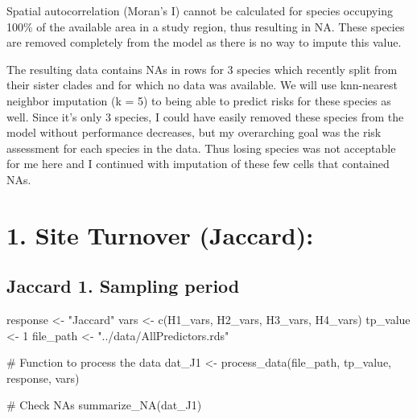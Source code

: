 \documentclass[
  letterpaper,
  DIV=11,
  numbers=noendperiod]{scrreprt}
\newenvironment{Shaded}{\begin{snugshade}}{\end{snugshade}}
\newcommand{\CommentTok}[1]{\textcolor[rgb]{0.37,0.37,0.37}{#1}}
\newcommand{\DecValTok}[1]{\textcolor[rgb]{0.68,0.00,0.00}{#1}}
\newcommand{\FunctionTok}[1]{\textcolor[rgb]{0.28,0.35,0.67}{#1}}
\newcommand{\NormalTok}[1]{\textcolor[rgb]{0.00,0.23,0.31}{#1}}
\newcommand{\OtherTok}[1]{\textcolor[rgb]{0.00,0.23,0.31}{#1}}
\newcommand{\StringTok}[1]{\textcolor[rgb]{0.13,0.47,0.30}{#1}}
\begin{document}
Spatial autocorrelation (Moran's I) cannot be calculated for species
occupying 100\% of the available area in a study region, thus resulting
in NA. These species are removed completely from the model as there is
no way to impute this value.

The resulting data contains NAs in rows for 3 species which recently
split from their sister clades and for which no data was available. We
will use knn-nearest neighbor imputation (k = 5) to being able to
predict risks for these species as well. Since it's only 3 species, I
could have easily removed these species from the model without
performance decreases, but my overarching goal was the risk assessment
for each species in the data. Thus losing species was not acceptable for
me here and I continued with imputation of these few cells that
contained NAs.

\section{1. Site Turnover (Jaccard):}\label{site-turnover-jaccard}

\subsection{Jaccard 1. Sampling period}

\begin{Shaded}
\begin{Highlighting}[]
\NormalTok{response }\OtherTok{\textless{}{-}} \StringTok{"Jaccard"}
\NormalTok{vars }\OtherTok{\textless{}{-}} \FunctionTok{c}\NormalTok{(H1\_vars, H2\_vars, H3\_vars, H4\_vars)}
\NormalTok{tp\_value }\OtherTok{\textless{}{-}} \DecValTok{1}
\NormalTok{file\_path }\OtherTok{\textless{}{-}} \StringTok{"../data/AllPredictors.rds"}

\CommentTok{\# Function to process the data}
\NormalTok{dat\_J1 }\OtherTok{\textless{}{-}} \FunctionTok{process\_data}\NormalTok{(file\_path, tp\_value, response, vars)}

\CommentTok{\# Check NAs}
\FunctionTok{summarize\_NA}\NormalTok{(dat\_J1)}
\end{Highlighting}
\end{Shaded}
\end{document}
